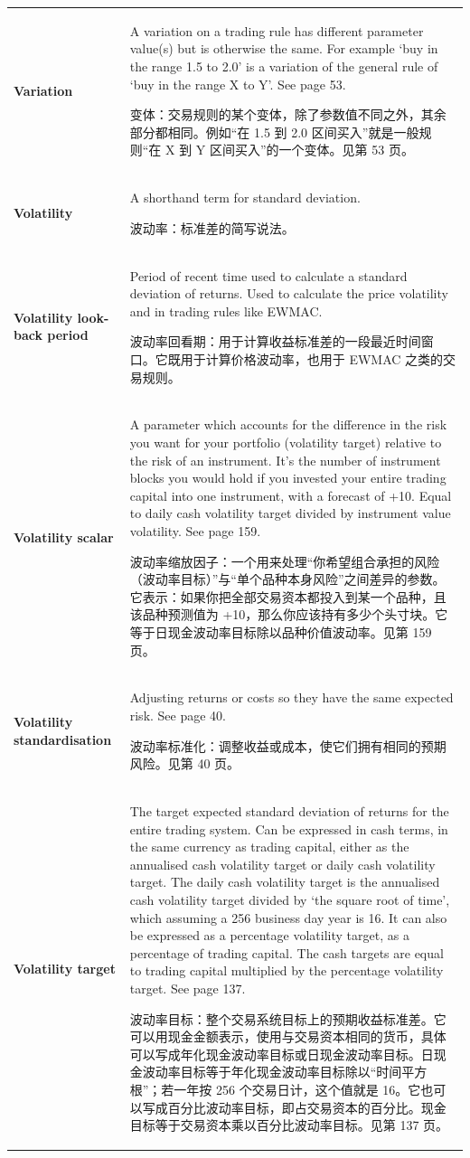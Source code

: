 \begin{chinesetableblock}
{\begin{longtable}{@{}>{\raggedright\arraybackslash\bfseries} p{}>{\raggedright\arraybackslash} p{}@{}}
Variation & A variation on a trading rule has different parameter value(s) but is otherwise the same. For example ‘buy in the range 1.5 to 2.0’ is a variation of the general rule of ‘buy in the range X to Y’. See page 53. \par 变体：交易规则的某个变体，除了参数值不同之外，其余部分都相同。例如“在 1.5 到 2.0 区间买入”就是一般规则“在 X 到 Y 区间买入”的一个变体。见第 53 页。 \\[0.65em]
Volatility & A shorthand term for standard deviation. \par 波动率：标准差的简写说法。 \\[0.65em]
Volatility look-back period & Period of recent time used to calculate a standard deviation of returns. Used to calculate the price volatility and in trading rules like EWMAC. \par 波动率回看期：用于计算收益标准差的一段最近时间窗口。它既用于计算价格波动率，也用于 EWMAC 之类的交易规则。 \\[0.65em]
Volatility scalar & A parameter which accounts for the difference in the risk you want for your portfolio (volatility target) relative to the risk of an instrument. It’s the number of instrument blocks you would hold if you invested your entire trading capital into one instrument, with a forecast of +10. Equal to daily cash volatility target divided by instrument value volatility. See page 159. \par 波动率缩放因子：一个用来处理“你希望组合承担的风险（波动率目标）”与“单个品种本身风险”之间差异的参数。它表示：如果你把全部交易资本都投入到某一个品种，且该品种预测值为 +10，那么你应该持有多少个头寸块。它等于日现金波动率目标除以品种价值波动率。见第 159 页。 \\[0.65em]
Volatility standardisation & Adjusting returns or costs so they have the same expected risk. See page 40. \par 波动率标准化：调整收益或成本，使它们拥有相同的预期风险。见第 40 页。 \\[0.65em]
Volatility target & The target expected standard deviation of returns for the entire trading system. Can be expressed in cash terms, in the same currency as trading capital, either as the annualised cash volatility target or daily cash volatility target. The daily cash volatility target is the annualised cash volatility target divided by ‘the square root of time’, which assuming a 256 business day year is 16. It can also be expressed as a percentage volatility target, as a percentage of trading capital. The cash targets are equal to trading capital multiplied by the percentage volatility target. See page 137. \par 波动率目标：整个交易系统目标上的预期收益标准差。它可以用现金金额表示，使用与交易资本相同的货币，具体可以写成年化现金波动率目标或日现金波动率目标。日现金波动率目标等于年化现金波动率目标除以“时间平方根”；若一年按 256 个交易日计，这个值就是 16。它也可以写成百分比波动率目标，即占交易资本的百分比。现金目标等于交易资本乘以百分比波动率目标。见第 137 页。 \\[0.65em]
\end{longtable}
}
\end{chinesetableblock}
